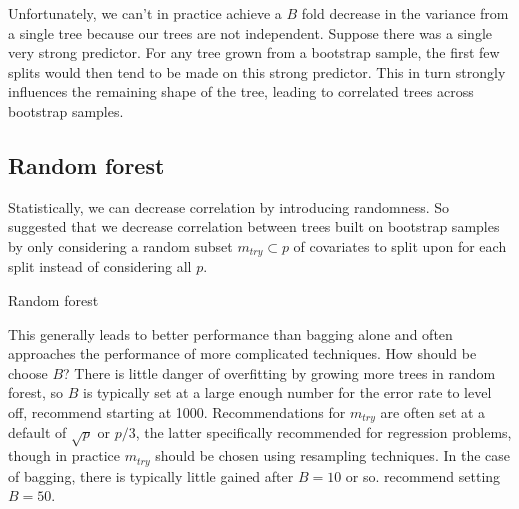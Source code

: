 \documentclass[12pt]{article}
\begin{document}
Unfortunately, we can't in practice achieve a $B$ fold decrease in the variance from a single tree because our trees are not independent. Suppose there was a single very strong predictor. For any tree grown from a bootstrap sample, the first few splits would then tend to be made on this strong predictor. This in turn strongly influences the remaining shape of the tree, leading to correlated trees across bootstrap samples.


\subsection{Random forest} %
\label{sub:random_forest}

Statistically, we can decrease correlation by introducing randomness. So \textcite{rf} suggested that we decrease correlation between trees built on bootstrap samples by only considering a random subset $m_{try} \subset p$ of covariates to split upon for each split instead of considering all $p$.

\begin{algorithm}[ht]
 \caption{Random forest}
\end{algorithm}

This generally leads to better performance than bagging alone and often approaches the performance of more complicated techniques. How should be choose $B$? There is little danger of overfitting by growing more trees in random forest, so $B$ is typically set at a large enough number for the error rate to level off, \textcite{apm} recommend starting at 1000. Recommendations for $m_{try}$ are often set at a default of $\sqrt{p}$ or $p/3$, the latter specifically recommended for regression problems, though in practice $m_{try}$ should be chosen using resampling techniques. In the case of bagging, there is typically little gained after $B = 10$ or so. \textcite{apm} recommend setting $B = 50$.

\end{document}
